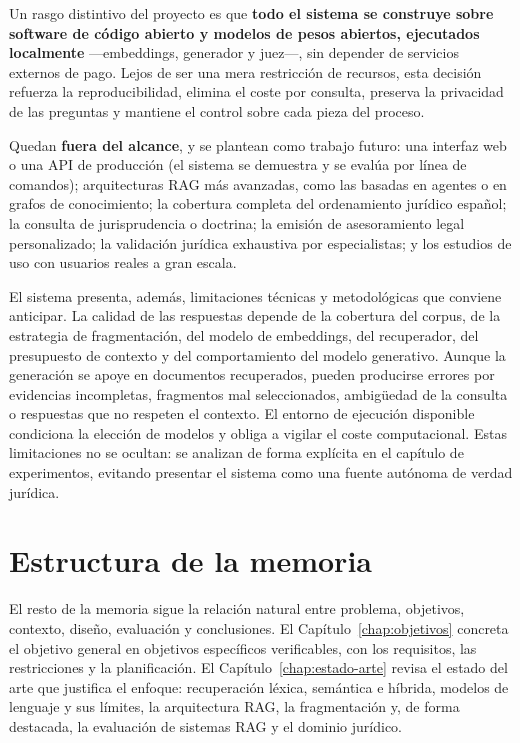 Un rasgo distintivo del proyecto es que \textbf{todo el sistema se construye sobre software de código abierto y modelos de pesos abiertos, ejecutados localmente} —embeddings, generador y juez—, sin depender de servicios externos de pago. Lejos de ser una mera restricción de recursos, esta decisión refuerza la reproducibilidad, elimina el coste por consulta, preserva la privacidad de las preguntas y mantiene el control sobre cada pieza del proceso.
 
Quedan \textbf{fuera del alcance}, y se plantean como trabajo futuro: una interfaz web o una API de producción (el sistema se demuestra y se evalúa por línea de comandos); arquitecturas RAG más avanzadas, como las basadas en agentes o en grafos de conocimiento; la cobertura completa del ordenamiento jurídico español; la consulta de jurisprudencia o doctrina; la emisión de asesoramiento legal personalizado; la validación jurídica exhaustiva por especialistas; y los estudios de uso con usuarios reales a gran escala.
 
El sistema presenta, además, limitaciones técnicas y metodológicas que conviene anticipar. La calidad de las respuestas depende de la cobertura del corpus, de la estrategia de fragmentación, del modelo de embeddings, del recuperador, del presupuesto de contexto y del comportamiento del modelo generativo. Aunque la generación se apoye en documentos recuperados, pueden producirse errores por evidencias incompletas, fragmentos mal seleccionados, ambigüedad de la consulta o respuestas que no respeten el contexto. El entorno de ejecución disponible condiciona la elección de modelos y obliga a vigilar el coste computacional. Estas limitaciones no se ocultan: se analizan de forma explícita en el capítulo de experimentos, evitando presentar el sistema como una fuente autónoma de verdad jurídica.
 
\section{Estructura de la memoria}

\label{sec:estructura-memoria}
 
El resto de la memoria sigue la relación natural entre problema, objetivos, contexto, diseño, evaluación y conclusiones. El Capítulo~\ref{chap:objetivos} concreta el objetivo general en objetivos específicos verificables, con los requisitos, las restricciones y la planificación. El Capítulo~\ref{chap:estado-arte} revisa el estado del arte que justifica el enfoque: recuperación léxica, semántica e híbrida, modelos de lenguaje y sus límites, la arquitectura RAG, la fragmentación y, de forma destacada, la evaluación de sistemas RAG y el dominio jurídico.

